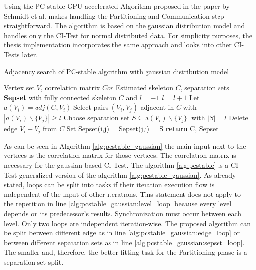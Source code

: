 Using the PC-stable GPU-accelerated Algorithm proposed in the paper by Schmidt et al. \cite{schmidtOrderIndependentConstraintBasedCausal2018} makes handling the Partitioning and Communication step straightforward. The algorithm is based on the gaussian distribution model and handles only the CI-Test for normal distributed data. For simplicity purposes, the thesis implementation incorporates the same approach and looks into other CI-Tests later.

\begin{algorithm}
    \caption{Adjacency search of PC-stable algorithm with gaussian distribution model \cite{schmidtOrderIndependentConstraintBasedCausal2018, colomboOrderIndependentConstraintBasedCausal}}
    \label{alg:pcstable_gaussian}
    \begin{algorithmic}[1]
    \Require Vertex set $V$, correlation matrix $Cor$
    \Ensure Estimated skeleton $C$, separation sets \textbf{Sepset}
    \State with fully connected skeleton $C$ and $l = -1$
    \Repeat \label{alg:pcstable_gaussian:level_loop}
        \State $l=l+1$
            \State Let $a(V_i) = adj(C,V_i)$
        \EndFor
        \Repeat \label{alg:pcstable_gaussian:edge_loop}
            \State Select pairs $(V_i,V_j)$ adjacent in $C$ with $|a(V_i)\backslash\{V_j\}| \geq l$
            \Repeat \label{alg:pcstable_gaussian:sepset_loop}
                \State Choose separation set $S \subseteq a(V_i ) \backslash \{V_j\}|$ with $| S | = l$
                    \State Delete edge $V_i - V_j$ from $C$
                    \State Set Sepset(i,j) = Sepset(j,i) = S
                \EndIf
    \State \textbf{return} C, Sepset
    \end{algorithmic}
\end{algorithm}

As can be seen in Algorithm \ref{alg:pcstable_gaussian} the main input next to the vertices is the correlation matrix for those vertices. The correlation matrix is necessary for the gaussian-based CI-Test. The algorithm \ref{alg:pcstable} is a CI-Test generalized version of the algorithm \ref{alg:pcstable_gaussian}.
As already stated, loops can be split into tasks if their iteration execution flow is independent of the input of other iterations. This statement does not apply to the repetition in line \ref{alg:pcstable_gaussian:level_loop} because every level depends on its predecessor's results. Synchronization must occur between each level.
Only two loops are independent iteration-wise. The proposed algorithm can be split between different edge as in line \ref{alg:pcstable_gaussian:edge_loop} or between different separation sets as in line \ref{alg:pcstable_gaussian:sepset_loop}. The smaller and, therefore, the better fitting task for the Partitioning phase is a separation set split.

